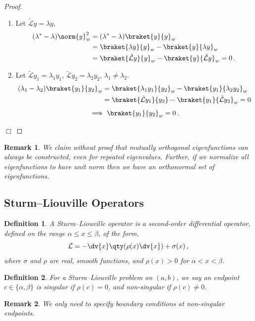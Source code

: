 \documentclass{article}
\theoremstyle{plain}\theoremheaderfont{\normalfont\itshape}\theorembodyfont{\rmfamily}\theoremseparator{.}\newtheorem*{rem}{Remark}\newtheorem*{ex}{Example}\newtheorem*{proof}{Proof}\newtheorem*{altp}{Alternative proof}
\theoremstyle{plain}\theoremheaderfont{\normalfont\bfseries}\theorembodyfont{\rmfamily}\theoremseparator{.}\newtheorem{thm}{Theorem}[section]\newtheorem{lem}[thm]{Lemma}\newtheorem{prop}[thm]{Proposition}\newtheorem*{cor}{Corollary}\newtheorem{defn}[thm]{Definition}\newtheorem{clm}[thm]{Claim}\newtheorem{clminproof}{Claim}
\theoremstyle{break}\theoremheaderfont{\normalfont\itshape}\theorembodyfont{\rmfamily}\theoremseparator{.\medskip}\newtheorem*{proofskip}{Proof}\newtheorem*{exs}{Examples}\newtheorem*{rems}{Remarks}
\theoremstyle{break}\theoremheaderfont{\normalfont\bfseries}\theorembodyfont{\rmfamily}\theoremseparator{.\medskip}\newtheorem{lemskip}[thm]{Lemma}\newtheorem{defnskip}[thm]{Definition}\newtheorem{propskip}[thm]{Proposition}\newtheorem{thmskip}[thm]{Theorem}
\numberwithin{equation}{section}
\newcommand{\qed}{\hfill\ensuremath{\Box}}
\begin{document}
	\begin{proof}
		\begin{enumerate}[topsep=0pt]
			\item Let \(\tilde{\mathcal{L}}y=\lambda y\),
			\begin{align*}
				(\lambda^*-\lambda)\norm{y}_w^2&=(\lambda^*-\lambda)\braket{y}{y}_w\\
				&=\braket{\lambda y}{y}_w-\braket{y}{\lambda y}_w\\
				&=\braket{\tilde{\mathcal{L}}y}{y}_w-\braket{y}{\tilde{\mathcal{L}}y}_w=0\,.
			\end{align*}
			\item Let \(\tilde{\mathcal{L}}y_1=\lambda_1y_1\), \(\tilde{\mathcal{L}}y_2=\lambda_2y_2\), \(\lambda_1\ne \lambda_2\).
			\begin{align*}
				(\lambda_1-\lambda_2)\braket{y_1}{y_2}_w&=\braket{\lambda_1 y_1}{y_2}_w-\braket{y_1}{\lambda_2y_2}_w\\
				&=\braket{\tilde{\mathcal{L}}y_1}{y_2}-\braket{y_1}{\tilde{\mathcal{L}}y_2}_w=0
			\end{align*}
			\[\implies \braket{y_1}{y_2}_w=0\,.\]
		\end{enumerate}\qed
	\end{proof}

	\begin{rem}
		We claim without proof that mutually orthogonal eigenfunctions can always be constructed, even for repeated eigenvalues. Further, if we normalize all eigenfunctions to have unit norm then we have an orthonormal set of eigenfunctions.
	\end{rem}

	\subsection{Sturm--Liouville Operators}
	\begin{defn}
		A \textit{Sturm--Liouville operator} is a second-order differential operator, defined on the range \(\alpha\le x\le\beta\), of the form,
		\[\mathcal{L}=-\dv{x}\qty(\rho(x)\dv{x})+\sigma(x)\,,\]
		where \(\sigma\) and \(\rho\) are real, smooth functions, and \(\rho(x)>0\) for \(\alpha<x<\beta\).
	\end{defn}
	\begin{defn}
		For a Sturm--Liouville problem on \((a,b)\), we say an endpoint \(c\in\{\alpha,\beta\}\) is \textit{singular} if \(\rho(c)=0\), and \textit{non-singular} if \(\rho(c)\ne 0\).
	\end{defn}
	\begin{rem}
		We only need to specify boundary conditions at non-singular endpoints.
	\end{rem}
\end{document}
